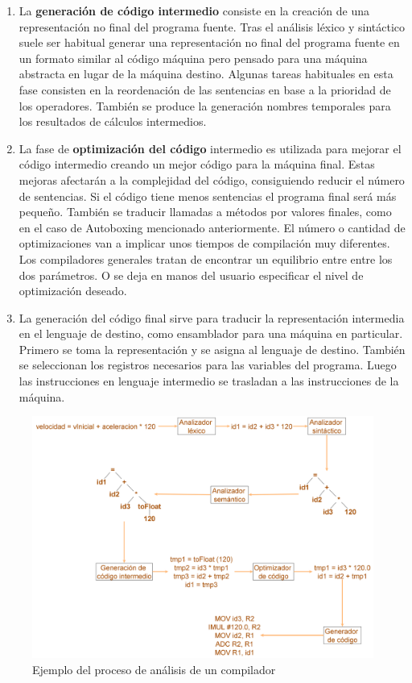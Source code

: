 \begin{enumerate}
    \item La \textbf{generación de código intermedio} consiste en la creación de una representación no final del programa fuente. Tras el análisis léxico y sintáctico suele ser habitual generar una representación no final del programa fuente en un formato similar al código máquina pero pensado para una máquina abstracta en lugar de la máquina destino. Algunas tareas habituales en esta fase consisten en la reordenación de las sentencias en base a la prioridad de los operadores. También se produce la generación nombres temporales para los resultados de cálculos intermedios.
    
    \item La fase de \textbf{optimización del código} intermedio es utilizada para mejorar el código intermedio creando un mejor código para la máquina final. Estas mejoras afectarán a la complejidad del código, consiguiendo reducir el número de sentencias. Si el código tiene menos sentencias el programa final será más pequeño. También se traducir llamadas a métodos por valores finales, como en el caso de Autoboxing mencionado anteriormente. El número o cantidad de optimizaciones van a implicar unos tiempos de compilación muy diferentes. Los compiladores generales tratan de encontrar un equilibrio entre entre los dos parámetros. O se deja en manos del usuario especificar el nivel de optimización deseado.
    
    \item La generación del código final sirve para traducir la representación intermedia en el lenguaje de destino, como ensamblador para una máquina en particular. Primero se toma la representación y se asigna al lenguaje de destino. También se seleccionan los registros necesarios para las variables del programa. Luego las instrucciones en lenguaje intermedio se trasladan a las instrucciones de la máquina.

\end{enumerate}

\begin{figure}[hp!]
    \centering
    \includegraphics[width=1.0\textwidth]{imaxes/c-bases-teoricas/analisis-lexico-sintactico.png}
    \caption{Ejemplo del proceso de análisis de un compilador}
    \label{fig:analisis-lexico-sintáctico}
\end{figure}
